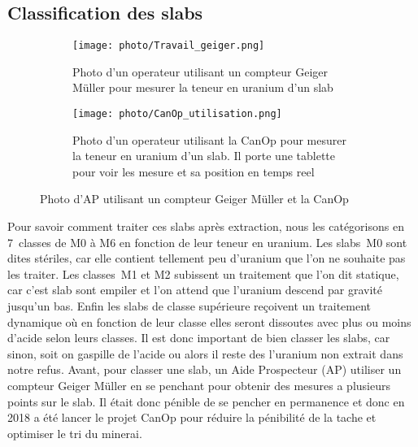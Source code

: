 \subsection{Classification des slabs}
\label{ssec_classification}
\begin{figure}

    \begin{subfigure}[t]{0.4\textwidth}
        \centering
        \texttt{[image: photo/Travail\_geiger.png]}
        \caption{Photo d'un operateur utilisant un compteur Geiger Müller pour mesurer la teneur en uranium d'un slab}
        \label{fig_AP_geiger}
    \end{subfigure}
    \begin{subfigure}[t]{0.6\textwidth}
        \centering
        \texttt{[image: photo/CanOp\_utilisation.png]}
        \caption{Photo d'un operateur utilisant la CanOp pour mesurer la teneur en uranium d'un slab. Il porte une tablette pour voir les mesure et sa position en temps reel}
        \label{fig_AP_CanOp}
    \end{subfigure}
    \caption{Photo d'AP utilisant un compteur Geiger Müller et la CanOp}
\end{figure}
Pour savoir comment traiter ces slabs  après extraction, nous les catégorisons en 7~classes de M0 à M6 en fonction de leur teneur en uranium. Les slabs~M0 sont dites stériles, car elle contient tellement peu d'uranium que l'on ne souhaite pas les traiter. Les classes~M1 et M2 subissent un traitement que l'on dit statique, car c'est slab sont empiler et l’on attend que l'uranium descend par gravité jusqu'un bas. Enfin les slabs de classe supérieure reçoivent un traitement dynamique où en fonction de leur classe elles seront dissoutes avec plus ou moins d'acide selon leurs classes. Il est donc important de bien classer les slabs, car sinon, soit on gaspille  de l'acide ou alors il reste des l'uranium non extrait dans notre refus.
Avant, pour classer une slab, un Aide Prospecteur (AP) utiliser un compteur Geiger Müller en se penchant pour obtenir des mesures a plusieurs points sur le slab. Il était donc pénible de se pencher en permanence et donc en 2018 a été lancer le projet CanOp pour réduire la pénibilité de la tache et optimiser le tri du minerai.
